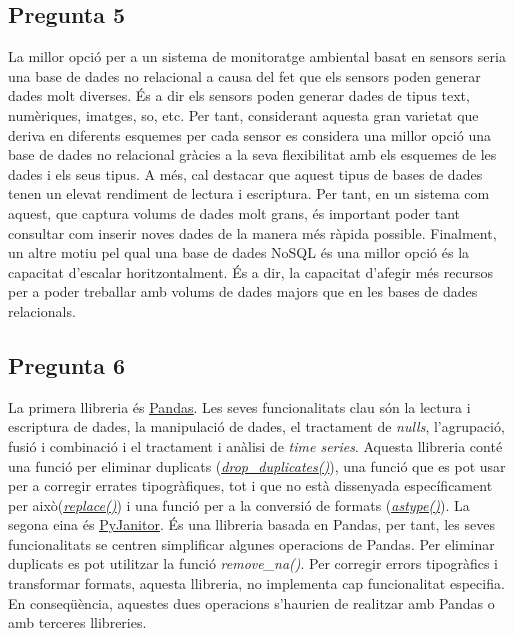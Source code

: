 \documentclass[a4paper,12pt]{report}
\begin{document}
\subsection*{Pregunta 5}
La millor opció per a un sistema de monitoratge ambiental basat en sensors seria una base de dades no relacional a causa del fet que els sensors poden generar dades molt diverses. És a dir els sensors poden generar dades de tipus text, numèriques, imatges, so, etc. Per tant, considerant aquesta gran varietat que deriva en diferents esquemes per cada sensor es considera una millor opció una base de dades no relacional gràcies a la seva flexibilitat amb els esquemes de les dades i els seus tipus. A més, cal destacar que aquest tipus de bases de dades tenen un elevat rendiment de lectura i escriptura. Per tant, en un sistema com aquest, que captura volums de dades molt grans, és important poder tant consultar com inserir noves dades de la manera més ràpida possible. Finalment, un altre motiu pel qual una base de dades NoSQL és una millor opció és la capacitat d'escalar horitzontalment. És a dir, la capacitat d'afegir més recursos per a poder treballar amb volums de dades majors que en les bases de dades relacionals.
\subsection*{Pregunta 6}
La primera llibreria és \href{https://pandas.pydata.org/docs/}{\underline{Pandas}}. Les seves funcionalitats clau són la lectura i escriptura de dades, la manipulació de dades, el tractament de \textit{nulls}, l'agrupació, fusió i combinació i el tractament i anàlisi de \textit{time series}. Aquesta llibreria conté una funció per eliminar duplicats (\href{https://pandas.pydata.org/docs/reference/api/pandas.DataFrame.drop_duplicates.html}{\underline{\textit{drop\_duplicates()}}}), una funció que es pot usar per a corregir errates tipogràfiques, tot i que no està dissenyada específicament per això(\href{https://pandas.pydata.org/docs/reference/api/pandas.DataFrame.replace.html}{\underline{\textit{replace()}}}) i una funció per a la conversió de formats (\href{https://pandas.pydata.org/docs/reference/api/pandas.DataFrame.astype.html}{\underline{\textit{astype()}}}).
La segona eina és \href{https://pyjanitor-devs.github.io/pyjanitor/}{\underline{PyJanitor}}. És una llibreria basada en Pandas, per tant, les seves funcionalitats se centren simplificar algunes operacions de Pandas. Per eliminar duplicats es pot utilitzar la funció \textit{remove\_na()}. Per corregir errors tipogràfics i transformar formats, aquesta llibreria, no implementa cap funcionalitat especifia. En conseqüència, aquestes dues operacions s'haurien de realitzar amb Pandas o amb terceres llibreries.
\end{document}
